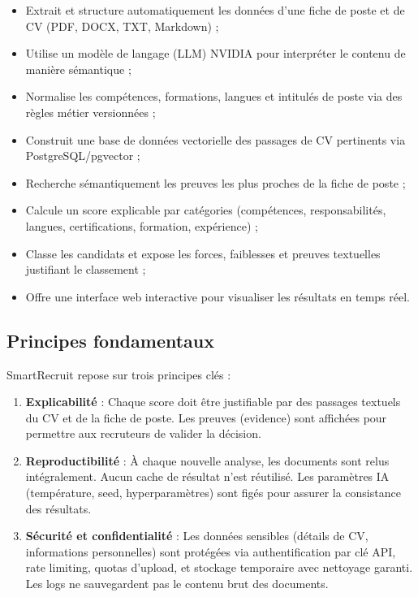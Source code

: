 \documentclass[12pt,a4paper,oneside]{book}
\begin{document}
\begin{itemize}
    \item Extrait et structure automatiquement les données d'une fiche de poste et de CV (PDF, DOCX, TXT, Markdown) ;
    \item Utilise un modèle de langage (LLM) NVIDIA pour interpréter le contenu de manière sémantique ;
    \item Normalise les compétences, formations, langues et intitulés de poste via des règles métier versionnées ;
    \item Construit une base de données vectorielle des passages de CV pertinents via PostgreSQL/pgvector ;
    \item Recherche sémantiquement les preuves les plus proches de la fiche de poste ;
    \item Calcule un score explicable par catégories (compétences, responsabilités, langues, certifications, formation, expérience) ;
    \item Classe les candidats et expose les forces, faiblesses et preuves textuelles justifiant le classement ;
    \item Offre une interface web interactive pour visualiser les résultats en temps réel.
\end{itemize}

\subsection{Principes fondamentaux}

SmartRecruit repose sur trois principes clés :

\begin{enumerate}
    \item \textbf{Explicabilité} : Chaque score doit être justifiable par des passages textuels du CV et de la fiche de poste. Les preuves (evidence) sont affichées pour permettre aux recruteurs de valider la décision.
    
    \item \textbf{Reproductibilité} : À chaque nouvelle analyse, les documents sont relus intégralement. Aucun cache de résultat n'est réutilisé. Les paramètres IA (température, seed, hyperparamètres) sont figés pour assurer la consistance des résultats.
    
    \item \textbf{Sécurité et confidentialité} : Les données sensibles (détails de CV, informations personnelles) sont protégées via authentification par clé API, rate limiting, quotas d'upload, et stockage temporaire avec nettoyage garanti. Les logs ne sauvegardent pas le contenu brut des documents.
\end{enumerate}
\end{document}
